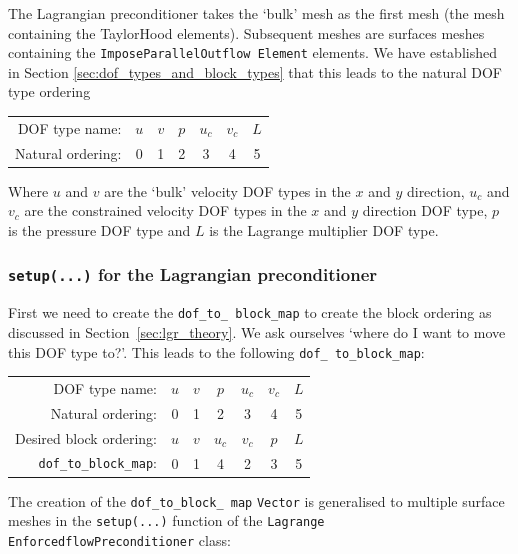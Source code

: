 The Lagrangian preconditioner takes the `bulk' mesh as the first mesh (the mesh
containing the TaylorHood elements). Subsequent meshes are surfaces meshes
containing the \texttt{Impose\allowbreak Parallel\allowbreak Outflow\allowbreak
  Element} elements. We have established in Section
\ref{sec:dof_types_and_block_types} that this leads to the natural DOF type
ordering
\begin{center}
    \begin{tabular}{ | r | c c c c c c |}
    \hline
    DOF type name:    & $u$ & $v$ & $p$ & $u_c$ & $v_c$ & $L$ \\ 
    Natural ordering: & 0   &  1  &  2  &   3   &   4   &  5  \\ 
    \hline
    \end{tabular}
\end{center}
Where $u$ and $v$ are the `bulk' velocity DOF types in the $x$ and $y$
direction, $u_c$ and $v_c$ are the constrained velocity DOF types in the $x$
and $y$ direction DOF type, $p$ is the pressure DOF type and $L$ is the
Lagrange multiplier DOF type. 


 \subsubsection{\texttt{setup(...)} for the Lagrangian preconditioner\label{sec:lgr_setup}}
First we need to create the \texttt{dof\_\allowbreak to\_\allowbreak
  block\_\allowbreak map} to create the block ordering as discussed in
Section~\ref{sec:lgr_theory}. We ask ourselves `where do I want to move this
DOF type to?'. This leads to the following \texttt{dof\_\allowbreak
  to\_\allowbreak block\_\allowbreak map}:
\begin{center}
    \begin{tabular}{ | r | c c c c c c |}
    \hline
    DOF type name:      & $u$ & $v$ & $p$ & $u_c$  & $v_c$ & $L$ \\ 
    Natural ordering:   & 0   &  1  &  2  &   3    &   4   &  5  \\ 
Desired block ordering: & $u$ & $v$ & $u_c$ & $v_c$& $p$   & $L$ \\ 
\texttt{dof\_to\_block\_map}:& 0   &  1  &  4  &   2    &   3   &  5  \\
    \hline
    \end{tabular}
\end{center}
The creation of the \texttt{dof\_\allowbreak to\_\allowbreak block\_\allowbreak
  map} \texttt{Vector} is generalised to multiple surface meshes in the
\texttt{setup(...)} function of the \texttt{Lagrange\allowbreak
  Enforcedflow\allowbreak Preconditioner} class:


